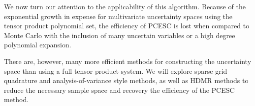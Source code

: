 \documentclass[11pt]{article} %
\begin{document}
We now turn our attention to the applicability of this algorithm.  Because of the exponential growth in expense for multivariate uncertainty spaces using the tensor product polynomial set, the efficiency of PCESC is lost when compared to Monte Carlo with the inclusion of many uncertain variables or a high degree polynomial expansion.  

There are, however, many more efficient methods for constructing the uncertainty space than using a full tensor product system.  We will explore sparse grid quadrature and analysis-of-variance style methods, as well as HDMR methods to reduce the necessary sample space and recovery the efficiency of the PCESC method.
\end{document}
